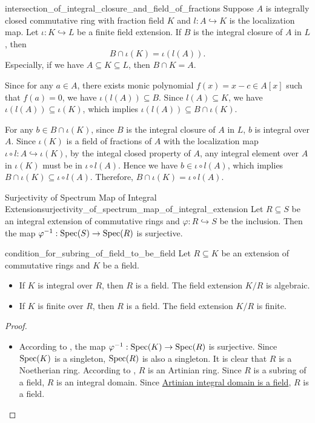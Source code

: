 \begin{proposition}{}{intersection_of_integral_closure_and_field_of_fractions}
    Suppose $A$ is integrally closed commutative ring with fraction field $K$ and $l:A\hookrightarrow K$ is the localization map. Let $\iota: K\hookrightarrow L$ be a finite field extension. If $B$ is the integral closure of $A$ in $L$, then 
    \[
    B\cap \iota(K)=\iota(l(A)).
    \]
    Especially, if we have $A\subseteq K\subseteq L$, then $B\cap K=A$.
\end{proposition}
\begin{prf}
    Since for any $a\in A$, there exists monic polynomial $f(x)=x-c\in A[x]$ such that $f(a)=0$, we have $\iota(l(A))\subseteq B$. Since $l(A)\subseteq K$, we have $\iota(l(A))\subseteq \iota(K)$, which implies $\iota(l(A)) \subseteq B\cap \iota(K)$. 

    For any $b\in B\cap \iota(K)$, since $B$ is the integral closure of $A$ in $L$, $b$ is integral over $A$. Since $\iota(K)$ is a field of fractions of $A$ with the localization map $\iota\circ l: A\hookrightarrow \iota(K)$, by the integal closed property of $A$, any integral element over $A$ in $\iota(K)$ must be in $\iota\circ l(A)$. Hence we have $b\in \iota\circ l(A)$, which implies $B\cap \iota(K)\subseteq \iota\circ l(A)$. Therefore, $B\cap \iota(K)=\iota\circ l(A)$.
\end{prf}

\begin{proposition}{Surjectivity of Spectrum Map of Integral Extension}{surjectivity_of_spectrum_map_of_integral_extension}
    Let $R\subseteq S$ be an integral extension of commutative rings and $\varphi:R\hookrightarrow S$ be the inclusion. Then the map $\varphi^{-1}:\operatorname{Spec} (S)\to \operatorname{Spec} (R)$ is surjective.
\end{proposition}


\begin{proposition}{}{condition_for_subring_of_field_to_be_field}
    Let $R\subseteq K$ be an extension of commutative rings and $K$ be a field. 
    \begin{itemize}
        \item If $K$ is integral over $R$, then $R$ is a field. The field extension $K/R$ is algebraic.
        \item If $K$ is finite over $R$, then $R$ is a field. The field extension $K/R$ is finite.
    \end{itemize}
\end{proposition}
\begin{proof}
    \begin{itemize}
        \item According to , the map $\varphi^{-1}:\operatorname{Spec} (K)\to \operatorname{Spec} (R)$ is surjective. Since $\operatorname{Spec} (K)$ is a singleton, $\operatorname{Spec} (R)$ is also a singleton. It is clear that $R$ is a Noetherian ring. According to , $R$ is an Artinian ring. Since $R$ is a subring of a field, $R$ is an integral domain. Since \hyperref[th:artinian_integral_domain_is_a_field]{Artinian integral domain is a field}, $R$ is a field.
    \end{itemize}
\end{proof}

